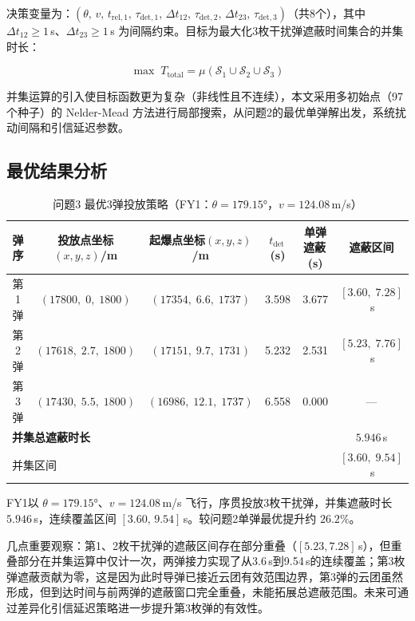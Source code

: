 \documentclass[12pt, a4paper]{article}
\begin{document}
决策变量为：$(\theta,\,v,\,t_{\mathrm{rel},1},\,\tau_{\mathrm{det},1},\,\Delta t_{12},\,\tau_{\mathrm{det},2},\,\Delta t_{23},\,\tau_{\mathrm{det},3})$（共8个），其中 $\Delta t_{12}\ge1$\,s、$\Delta t_{23}\ge1$\,s 为间隔约束。目标为最大化3枚干扰弹遮蔽时间集合的并集时长：

\begin{equation}
\max \; T_{\mathrm{total}} = \mu\!\left(\mathcal{S}_1 \cup \mathcal{S}_2 \cup \mathcal{S}_3\right)
\end{equation}

并集运算的引入使目标函数更为复杂（非线性且不连续），本文采用多初始点（97个种子）的 Nelder-Mead 方法进行局部搜索，从问题2的最优单弹解出发，系统扰动间隔和引信延迟参数。

\subsection{最优结果分析}

\begin{table}[H]
\centering
\caption{问题3 最优3弹投放策略（FY1：$\theta=179.15°$，$v=124.08$\,m/s）}
\begin{tabular}{cccccc}
\toprule
弹序 & 投放点坐标$(x,y,z)$/m & 起爆点坐标$(x,y,z)$/m & $t_{\mathrm{det}}$\,(s) & 单弹遮蔽\,(s) & 遮蔽区间 \\
\midrule
第1弹 & $(17800,\;0,\;1800)$ & $(17354,\;6.6,\;1737)$ & 3.598 & 3.677 & $[3.60,\;7.28]$\,s \\
第2弹 & $(17618,\;2.7,\;1800)$ & $(17151,\;9.7,\;1731)$ & 5.232 & 2.531 & $[5.23,\;7.76]$\,s \\
第3弹 & $(17430,\;5.5,\;1800)$ & $(16986,\;12.1,\;1737)$ & 6.558 & 0.000 & — \\
\midrule
\multicolumn{5}{l}{\textbf{并集总遮蔽时长}} & $\mathbf{5.946}$\,s \\
\multicolumn{5}{l}{并集区间} & $[3.60,\;9.54]$\,s \\
\bottomrule
\end{tabular}
\end{table}

\begin{resultbox}[问题3 最优结论]
FY1以 $\theta=179.15°$、$v=124.08$\,m/s 飞行，序贯投放3枚干扰弹，并集遮蔽时长 $\mathbf{5.946}$\,s，连续覆盖区间 $[3.60,\,9.54]$\,s。较问题2单弹最优提升约 $26.2\%$。
\end{resultbox}

几点重要观察：第1、2枚干扰弹的遮蔽区间存在部分重叠（$[5.23,7.28]$\,s），但重叠部分在并集运算中仅计一次，两弹接力实现了从3.6\,s到9.54\,s的连续覆盖；第3枚弹遮蔽贡献为零，这是因为此时导弹已接近云团有效范围边界，第3弹的云团虽然形成，但到达时间与前两弹的遮蔽窗口完全重叠，未能拓展总遮蔽范围。未来可通过差异化引信延迟策略进一步提升第3枚弹的有效性。
\end{document}
